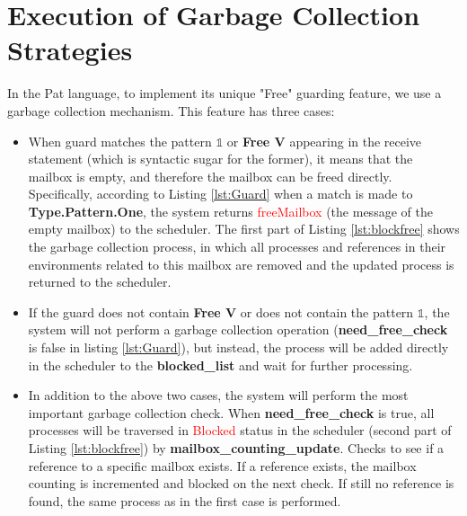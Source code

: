 \documentclass{l4proj}
\begin{document}
\section{Execution of Garbage Collection Strategies}

In the Pat language, to implement its unique "Free" guarding feature, we use a garbage collection mechanism. This feature has three cases:

\begin{itemize}
\item When guard matches the pattern $\mathbb{1}$ or \textbf{Free V} appearing in the receive statement (which is syntactic sugar for the former), it means that the mailbox is empty, and therefore the mailbox can be freed directly. Specifically, according to Listing \ref{lst:Guard} when a match is made to \textbf{Type.Pattern.One}, the system returns \textcolor{red}{freeMailbox} (the message of the empty mailbox) to the scheduler. The first part of Listing \ref{lst:blockfree} shows the garbage collection process, in which all processes and references in their environments related to this mailbox are removed and the updated process is returned to the scheduler.

\item If the guard does not contain \textbf{Free V} or does not contain the pattern $\mathbb{1}$, the system will not perform a garbage collection operation (\textbf{need\_free\_check} is false in listing \ref{lst:Guard}), but instead, the process will be added directly in the scheduler to the \textbf{blocked\_list} and wait for further processing.

\item In addition to the above two cases, the system will perform the most important garbage collection check. When \textbf{need\_free\_check} is true, all processes will be traversed in \textcolor{red}{Blocked} status in the scheduler (second part of Listing \ref{lst:blockfree}) by \textbf{mailbox\_counting\_update}. Checks to see if a reference to a specific mailbox exists. If a reference exists, the mailbox counting is incremented and blocked on the next check. If still no reference is found, the same process as in the first case is performed.
\end{itemize}
\end{document}
